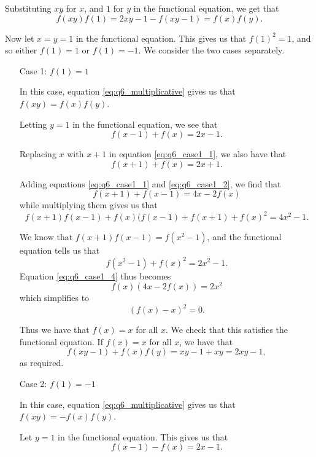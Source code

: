 \documentclass[12pt]{article}
\begin{document}
\begin{enumerate}
Substituting $xy$ for $x$, and $1$ for $y$ in the functional equation, we get
that
\begin{equation} \label{eq:q6_multiplicative}
    f(xy) f(1) = 2xy - 1 - f(xy - 1) = f(x) f(y).
\end{equation}

Now let $x = y = 1$ in the functional equation. This gives us that $f(1)^2 = 1$,
and so either $f(1) = 1$ or $f(1) = -1$. We consider the two cases separately.

\begin{enumerate}

\item[Case 1:] $f(1) = 1$

In this case, equation \ref{eq:q6_multiplicative} gives us that $f(xy) = f(x)
f(y)$.

Letting $y = 1$ in the functional equation, we see that
\begin{equation} \label{eq:q6_case1_1}
    f(x - 1) + f(x) = 2x - 1.
\end{equation}

Replacing $x$ with $x + 1$ in equation \ref{eq:q6_case1_1}, we also have that
\begin{equation} \label{eq:q6_case1_2}
    f(x + 1) + f(x) = 2x + 1.
\end{equation}

Adding equations \ref{eq:q6_case1_1} and \ref{eq:q6_case1_2}, we find that
\[
    f(x + 1) + f(x - 1) = 4x - 2f(x)
\]
while multiplying them gives us that
\begin{equation} \label{eq:q6_case1_4}
    f(x + 1) f(x - 1) + f(x) (f(x - 1) + f(x + 1) + f(x)^2 = 4x^2 - 1.
\end{equation}

We know that $f(x + 1) f(x - 1) = f(x^2 - 1)$, and the functional equation tells
us that
\[
    f(x^2 - 1) + f(x)^2 = 2x^2 - 1.
\]
Equation \ref{eq:q6_case1_4} thus becomes
\[
    f(x) (4x - 2f(x)) = 2x^2
\]
which simplifies to
\[
    (f(x) - x)^2 = 0.
\]

Thus we have that $f(x) = x$ for all $x$. We check that this satisfies the
functional equation. If $f(x) = x$ for all $x$, we have that
\[
    f(xy - 1) + f(x) f(y) = xy - 1 + xy = 2xy - 1,
\]
as required.

\item[Case 2:] $f(1) = -1$

In this case, equation \ref{eq:q6_multiplicative} gives us that $f(xy) = -f(x)
f(y)$.

Let $y = 1$ in the functional equation. This gives us that
\begin{equation} \label{eq:q6_case2_1}
    f(x - 1) - f(x) = 2x - 1.
\end{equation}


\end{enumerate}
\end{enumerate}
\end{document}
